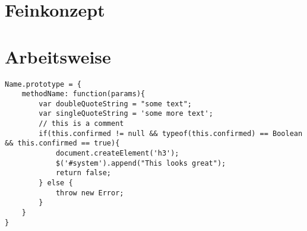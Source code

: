 \section{Feinkonzept}

\section{Arbeitsweise}
\medskip
\begin{lstlisting}[caption=My Javascript Example]
Name.prototype = {
	methodName: function(params){
		var doubleQuoteString = "some text";
		var singleQuoteString = 'some more text';
		// this is a comment
		if(this.confirmed != null && typeof(this.confirmed) == Boolean && this.confirmed == true){
			document.createElement('h3');
			$('#system').append("This looks great");
			return false;
		} else {
			throw new Error;
		}
	}
}
\end{lstlisting}
